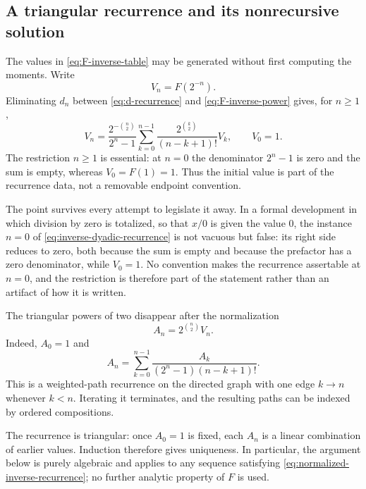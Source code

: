 \documentclass[11pt,oneside]{article}
\theoremstyle{definition}
\theoremstyle{remark}
\begin{document}
\subsection{A triangular recurrence and its nonrecursive solution}
\label{subsec:inverse-dyadic-compositions}

The values in \eqref{eq:F-inverse-table} may be generated without first computing the
moments.  Write
\begin{equation}
 V_n=F(2^{-n}).
\end{equation}
Eliminating $d_n$ between \eqref{eq:d-recurrence} and
\eqref{eq:F-inverse-power} gives, for $n\ge1$,
\begin{equation}
 V_n=\frac{2^{-\binom n2}}{2^n-1}
 \sum_{k=0}^{n-1}
 \frac{2^{\binom k2}}{(n-k+1)!}
 V_k,
 \qquad V_0=1.                                           \label{eq:inverse-dyadic-recurrence}
\end{equation}
The restriction $n\ge1$ is essential: at $n=0$ the denominator $2^n-1$ is zero and the
sum is empty, whereas $V_0=F(1)=1$.  Thus the initial value is part of the recurrence data,
not a removable endpoint convention.

The point survives every attempt to legislate it away.  In a formal development in which
division by zero is totalized, so that $x/0$ is given the value $0$, the instance $n=0$ of
\eqref{eq:inverse-dyadic-recurrence} is not vacuous but false: its right side reduces to
zero, both because the sum is empty and because the prefactor has a zero denominator, while
$V_0=1$.  No convention makes the recurrence assertable at $n=0$, and the restriction is
therefore part of the statement rather than an artifact of how it is written.

The triangular powers of two disappear after the normalization
\begin{equation}
 A_n=2^{\binom n2}V_n.
\end{equation}
Indeed, $A_0=1$ and
\begin{equation}
 A_n=\sum_{k=0}^{n-1}
 \frac{A_k}{(2^n-1)(n-k+1)!}.                            \label{eq:normalized-inverse-recurrence}
\end{equation}
This is a weighted-path recurrence on the directed graph with one edge $k\to n$ whenever
$k<n$.  Iterating it terminates, and the resulting paths can be indexed by ordered
compositions.

The recurrence is triangular: once $A_0=1$ is fixed, each $A_n$ is a linear combination
of earlier values.  Induction therefore gives uniqueness.  In particular, the argument
below is purely algebraic and applies to any sequence satisfying
\eqref{eq:normalized-inverse-recurrence}; no further analytic property of $F$ is used.
\end{document}
